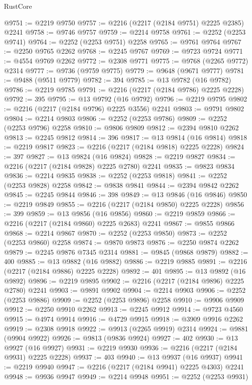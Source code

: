 \begin{lexlean}{RustCore}
\begin{coremodule}
@9751 := @2219 @9750
@9757 := @2216 (@2217 (@2184 @9751) @2225 @2385) @2241
@9758 := @9746 @9757
@9759 := @2214 @9758
@9761 := @2252 (@2253 @9741)
@9764 := @2252 (@2253 @9751) @2258
@9765 := @9761 @9764
@9767 := @2250 @9765 @2262
@9768 := @2245 @9767
@9769 := @9723 @9724
@9771 := @4554 @9769 @2262
@9772 := @2308 @9771
@9775 := @9768 (@2265 @9772) @2314
@9777 := @9736 (@9759 @9775)
@9779 := @9648 (@9671 @9777)
@9781 := @9488 (@9511 @9779)
@9782 := 394
@9785 := @13 @9782 (@16 @9782)
@9786 := @2219 @9785
@9791 := @2216 (@2217 (@2184 @9786) @2225 @2228)
@9792 := 395
@9795 := @13 @9792 (@16 @9792)
@9796 := @2219 @9795
@9802 := @2216 (@2217 (@2184 @9796) @2225 @3556) @2241
@9803 := @9791 @9802
@9804 := @2214 @9803
@9806 := @2252 (@2253 @9786)
@9809 := @2252 (@2253 @9796) @2258
@9810 := @9806 @9809
@9812 := @2394 @9810 @2262
@9813 := @2245 @9812
@9814 := 396
@9817 := @13 @9814 (@16 @9814)
@9818 := @2219 @9817
@9823 := @2216 (@2217 (@2184 @9818) @2225 @2228)
@9824 := 397
@9827 := @13 @9824 (@16 @9824)
@9828 := @2219 @9827
@9834 := @2216 (@2217 (@2184 @9828) @2225 @2780) @2241
@9835 := @9823 @9834
@9836 := @2214 @9835
@9838 := @2252 (@2253 @9818)
@9841 := @2252 (@2253 @9828) @2258
@9842 := @9838 @9841
@9844 := @2394 @9842 @2262
@9845 := @2245 @9844
@9846 := 398
@9849 := @13 @9846 (@16 @9846)
@9850 := @2219 @9849
@9855 := @2216 (@2217 (@2184 @9850) @2225 @2228)
@9856 := 399
@9859 := @13 @9856 (@16 @9856)
@9860 := @2219 @9859
@9866 := @2216 (@2217 (@2184 @9860) @2225 @2683) @2241
@9867 := @9855 @9866
@9868 := @2214 @9867
@9870 := @2252 (@2253 @9850)
@9873 := @2252 (@2253 @9860) @2258
@9874 := @9870 @9873
@9876 := @2250 @9874 @2262
@9879 := @2245 @9876 @7345 @2314
@9881 := @9845 (@9868 @9879)
@9882 := 400
@9885 := @13 @9882 (@16 @9882)
@9886 := @2219 @9885
@9891 := @2216 (@2217 (@2184 @9886) @2225 @2228)
@9892 := 401
@9895 := @13 @9892 (@16 @9892)
@9896 := @2219 @9895
@9902 := @2216 (@2217 (@2184 @9896) @2225 @2780) @2241
@9903 := @9891 @9902
@9904 := @2214 @9903
@9906 := @2252 (@2253 @9886)
@9909 := @2252 (@2253 @9896) @2258
@9910 := @9906 @9909
@9912 := @2250 @9910 @2262
@9913 := @2245 @9912
@9914 := @9723 @4560
@9915 := @4974 @9914
@9916 := @4729 @9915
@9918 := @3909 @9916 @2262
@9919 := @2308 @9918
@9922 := @9913 (@2265 @9919) @2314
@9924 := @9881 (@9904 @9922)
@9926 := @9813 (@9836 @9924)
@9927 := 402
@9930 := @13 @9927 (@16 @9927)
@9931 := @2219 @9930
@9936 := @2216 (@2217 (@2184 @9931) @2225 @2228)
@9937 := 403
@9940 := @13 @9937 (@16 @9937)
@9941 := @2219 @9940
@9947 := @2216 (@2217 (@2184 @9941) @2225 @4303) @2241
@9948 := @9936 @9947
@9949 := @2214 @9948
@9951 := @2252 (@2253 @9931)

\end{coremodule}
\end{lexlean}
